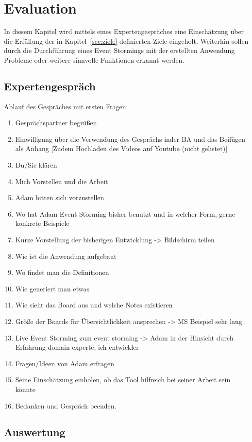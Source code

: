 \chapter{Evaluation}\label{ch:evaluation}
In diesem Kapitel wird mittels eines Expertengespräches eine Einschätzung über die Erfüllung der in
Kapitel~\ref{sec:ziele} definierten Ziele eingeholt.
Weiterhin sollen durch die Durchführung eines Event Stormings mit der erstellten Anwendung Probleme oder weitere sinnvolle
Funktionen erkannt werden.

\section{Expertengespräch}\label{sec:expertengespraech}
Ablauf des Gespräches mit ersten Fragen:
\begin{enumerate}
    \item Gesprächspartner begrüßen
    \item Einwilligung über die Verwendung des Gesprächs inder BA und das Beifügen als Anhang [Zudem Hochladen des Videos auf Youtube (nicht gelistet)]
    \item Du/Sie klären
    \item Mich Vorstellen und die Arbeit
    \item Adam bitten sich vorzustellen
    \item Wo hat Adam Event Storming bisher benutzt und in welcher Form, gerne konkrete Beispiele
    \item Kurze Vorstellung der bisherigen Entwicklung -> Bildschirm teilen
    \item Wie ist die Anwendung aufgebaut
    \item Wo findet man die Definitionen
    \item Wie generiert man etwas
    \item Wie sieht das Board aus und welche Notes existieren
    \item Größe der Boards für Übersichtlichkeit ansprechen -> MS Beispiel sehr lang
    \item Live Event Storming zum event storming -> Adam in der Hinsicht durch Erfahrung domain experte, ich entwickler
    \item Fragen/Ideen von Adam erfragen
    \item Seine Einschätzung einholen, ob das Tool hilfreich bei seiner Arbeit sein könnte
    \item Bedanken und Gespräch beenden.
\end{enumerate}

\section{Auswertung}\label{sec:auswertung}
